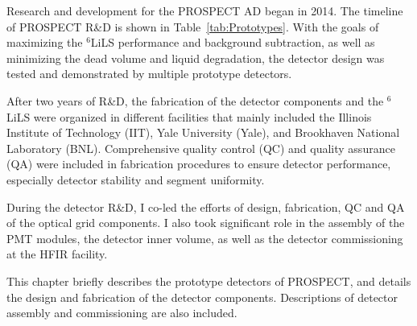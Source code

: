 \label{Ch4}

Research and development for the PROSPECT AD began in 2014.
The timeline of PROSPECT R\&D is shown in Table~\ref{tab:Prototypes}.
With the goals of maximizing the $^6$LiLS performance and background subtraction, as well as minimizing the dead volume and liquid degradation, the detector design was tested and demonstrated by multiple prototype detectors.

After two years of R\&D, the fabrication of the detector components and the $^6$LiLS were organized in different facilities that mainly included the Illinois Institute of Technology (IIT), Yale University (Yale), and Brookhaven National Laboratory (BNL).
Comprehensive quality control (QC) and quality assurance (QA) were included in fabrication procedures to ensure detector performance, especially detector stability and segment uniformity. 

During the detector R\&D, I co-led the efforts of design, fabrication, QC and QA of the optical grid components.
I also took significant role in the assembly of the PMT modules, the detector inner volume, as well as the detector commissioning at the HFIR facility.

This chapter briefly describes the prototype detectors of PROSPECT, and details the design and fabrication of the detector components. 
Descriptions of detector assembly and commissioning  are also included.

